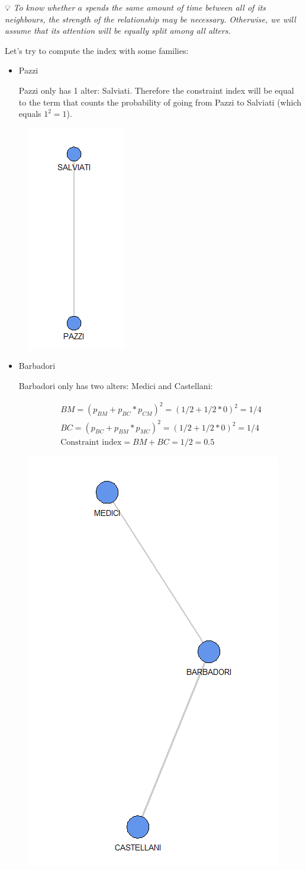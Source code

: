 \documentclass[
  notitlepage,
  onecolumn,
  openany]{book}
\begin{document}
💡 \emph{To know whether \(a\) spends the same amount of time between all of its neighbours, the strength of the relationship may be necessary. Otherwise, we will assume that its attention will be equally split among all alters.}

Let's try to compute the index with some families:

\begin{itemize}
\item
  Pazzi

  Pazzi only has 1 alter: Salviati. Therefore the constraint index will be equal to the term that counts the probability of going from Pazzi to Salviati (which equals \(1^2 = 1\)).
\end{itemize}

\begin{figure}[h!]

{\centering \includegraphics[width=0.15\linewidth]{images/08-Metrics for structural holes/Untitled 4} 

}

\end{figure}

\begin{itemize}
\item
  Barbadori

  Barbadori only has two alters: Medici and Castellani:

  \[
    \begin{aligned}
    BM = (p_{BM}+p_{BC}*p_{CM})^2 = (1/2+1/2*0)^2 = 1/4 \\
    BC = (p_{BC}+p_{BM}*p_{MC})^2 = (1/2+1/2*0)^2 = 1/4\\
    \text{Constraint index} = BM+BC = 1/2 = 0.5
    \end{aligned}
    \]
\end{itemize}

\begin{figure}[h!]

{\centering \includegraphics[width=0.3\linewidth]{images/08-Metrics for structural holes/Untitled 5} 

}

\end{figure}
\end{document}

